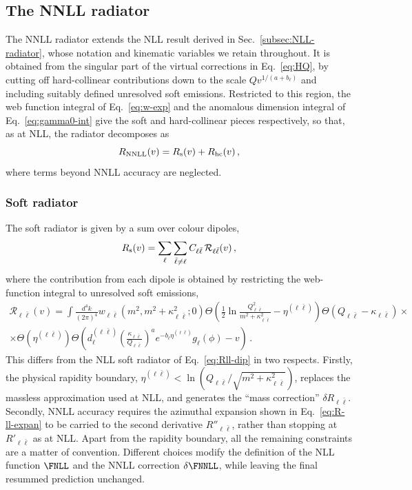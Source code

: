 \subsection{The NNLL radiator}
\label{sec:radiator}

The NNLL radiator extends the NLL result derived in
Sec.~\ref{subsec:NLL-radiator}, whose notation and kinematic variables
we retain throughout. It is obtained from the singular part of the
virtual corrections in Eq.~\eqref{eq:HQ}, by cutting off
hard-collinear contributions down to the scale $Qv^{1/(a+b_\ell)}$ and
including suitably defined unresolved soft emissions. Restricted to
this region, the web function integral of Eq.~\eqref{eq:w-exp} and the
anomalous dimension integral of Eq.~\eqref{eq:gamma0-int} give the
soft and hard-collinear pieces respectively, so that, as at NLL, the
radiator decomposes as
\begin{equation}
  \label{eq:radiator-NNLL}
  R_{\rm NNLL}(v)=R_{\rm s}(v)+R_{\rm hc}(v)\,,
\end{equation}
where terms beyond NNLL accuracy are neglected.

\subsubsection{Soft radiator}
\label{subsubsec:Rs-NNLL}

The soft radiator is given by a sum over colour dipoles,
  \begin{equation}
  	R_{\rm s}(v)= \sum_\ell\sum_{\bar \ell\ne \ell} C_{\ell\bar \ell} \,\mathcal{R}_{\ell\bar\ell}(v)\,, 
  \end{equation}
where the contribution from each dipole is obtained by restricting the
web-function integral to unresolved soft emissions,
\begin{multline}
  \label{eq:Rll}
  \mathcal{R}_{\ell\bar\ell}(v) = \int\frac{d^4
    k}{(2\pi)^4}w_{\ell\bar\ell}(m^2,m^2+\kappa_{\ell\bar\ell}^2;0)
  \Theta\left(\frac 12\ln\frac{Q^2_{\ell\bar
        \ell}}{m^2+\kappa_{\ell\bar \ell}^2}-\eta^{(\ell\bar \ell)}
  \right) \Theta(Q_{\ell \bar\ell}-\kappa_{\ell\bar \ell}) \times \\
  \times \Theta(\eta^{(\ell\bar \ell)})
  \Theta\left(d^{(\ell\bar\ell)}_\ell\left(\frac{\kappa_{\ell\bar
          \ell}}{Q_{\ell\bar\ell}}\right)^{a}
    e^{-b_\ell\eta^{(\ell\bar \ell)}} g_\ell(\phi)-v\right)\,.
\end{multline}
This differs from the NLL soft radiator of Eq.~\eqref{eq:Rll-dip} in
two respects. Firstly, the physical rapidity boundary,
$\eta^{(\ell\bar\ell)}<\ln\left(Q_{\ell\bar\ell}/\sqrt{m^2+\kappa_{\ell\bar\ell}^2}\right)$,
replaces the massless approximation used at NLL, and generates the
``mass correction'' $\delta R_{\ell\bar\ell}$. Secondly, NNLL accuracy
requires the azimuthal expansion shown in Eq.~\eqref{eq:R-ll-expan} to
be carried to the second derivative $R''_{\ell\bar\ell}$, rather than
stopping at $R'_{\ell\bar\ell}$ as at NLL. Apart from the rapidity
boundary, all the remaining constraints are a matter of convention.
Different choices modify the definition of the NLL function $\FNLL$
and the NNLL correction $\delta\FNNLL$, while leaving the final
resummed prediction unchanged.

